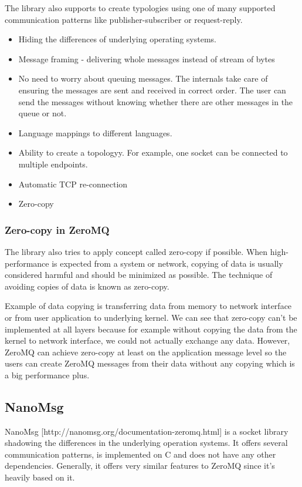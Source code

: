 The library also supports to create typologies using one of many supported communication patterns like publisher-subscriber or request-reply.
\begin{itemize}
	\item Hiding the differences of underlying operating systems.
	\item Message framing - delivering whole messages instead of stream of bytes
	\item No need to worry about queuing messages. The internals take care of ensuring the messages are sent and received in correct order. The user can send the messages without knowing whether there are other messages in the queue or not.
	\item Language mappings to different languages.
	\item Ability to create a topologyy. For example, one socket can be connected to multiple endpoints.
	\item Automatic TCP re-connection
	\item Zero-copy
\end{itemize}
\subsubsection{Zero-copy in ZeroMQ}
The library also tries to apply concept called zero-copy if possible. When high-performance is expected from a system or network, copying of data is usually considered harmful and should be minimized as possible. The technique of avoiding copies of data is known as zero-copy.

Example of data copying is transferring data from memory to network interface or from user application to underlying kernel.  We can see that zero-copy can't be implemented at all layers because for example without copying the data from the kernel to network interface, we could not actually exchange any data. However, ZeroMQ can achieve zero-copy at least on the application message level so the users can create ZeroMQ messages from their data without any copying which is a big performance plus.
\subsection{NanoMsg}
NanoMsg [http://nanomsg.org/documentation-zeromq.html] is a socket library shadowing the differences in the underlying operation systems. It offers several communication patterns, is implemented on C and does not have any other dependencies. Generally, it offers very similar features to ZeroMQ since it's heavily based on it.

